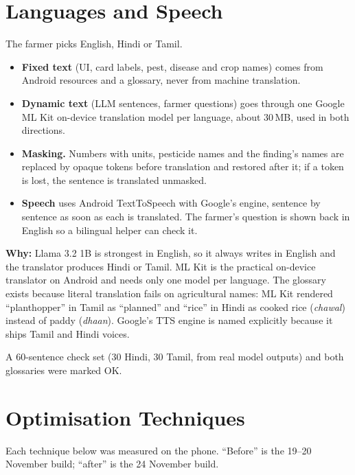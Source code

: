 \documentclass[11pt,a4paper]{article}
\newcommand{\why}[1]{\par\smallskip\noindent\colorbox{leaflight}{\parbox{\dimexpr\linewidth-2\fboxsep}{\small\textbf{\color{leaf}Why:} #1}}\par\smallskip}
\begin{document}
\section{Languages and Speech}\label{sec:lang}

The farmer picks English, Hindi or Tamil.

\begin{itemize}
\item \textbf{Fixed text} (UI, card labels, pest, disease and crop names) comes from Android resources and a glossary,
never from machine translation.
\item \textbf{Dynamic text} (LLM sentences, farmer questions) goes through one Google ML Kit on-device translation model
per language, about 30\,MB, used in both directions.
\item \textbf{Masking.} Numbers with units, pesticide names and the finding's names are replaced by opaque tokens
before translation and restored after it; if a token is lost, the sentence is translated unmasked.
\item \textbf{Speech} uses Android TextToSpeech with Google's engine, sentence by sentence as soon as each is
translated. The farmer's question is shown back in English so a bilingual helper can check it.
\end{itemize}

\why{Llama 3.2 1B is strongest in English, so it always writes in English and the translator produces Hindi or Tamil. ML Kit is
the practical on-device translator on Android and needs only one model per language. The glossary exists because
literal translation fails on agricultural names: ML Kit rendered ``planthopper'' in Tamil as ``planned'' and ``rice''
in Hindi as cooked rice (\textit{chawal}) instead of paddy (\textit{dhaan}). Google's TTS engine is named explicitly
because it ships Tamil and Hindi voices.}

A 60-sentence check set (30 Hindi, 30 Tamil, from real model outputs) and both glossaries were marked OK.

\section{Optimisation Techniques}\label{sec:opt}

Each technique below was measured on the phone. ``Before'' is the 19--20 November build; ``after'' is the
24 November build.
\end{document}
